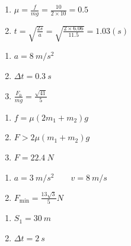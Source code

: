 \item \begin {enumerate} \renewcommand {\labelenumi }{\arabic {enumi}.} \item $\mu = \frac { f } { m g } = \frac { 10 } { 2 \times 10 } = 0.5$ \item $t = \sqrt { \frac { 2 s } { a } } = \sqrt { \frac { 2 \times 6.06 } { 11.5 } } = 1.03 ( s )$ \par \end {enumerate} \par \par 
\item \begin {enumerate} \renewcommand {\labelenumi }{\arabic {enumi}.} \item $ a=8\ m/s^{2} $ \item $ \Delta t=0.3\ s $ \item $\frac { F _ { 0 } } { m g } = \frac { \sqrt { 41 } } { 5 }$ \par \end {enumerate} \par \par 
\item \begin {enumerate} \renewcommand {\labelenumi }{\arabic {enumi}.} \item $f = \mu \left ( 2 m _ { 1 } + m _ { 2 } \right ) g$ \item $F > 2 \mu \left ( m _ { 1 } + m _ { 2 } \right ) g$ \item $F = 22.4\ N$ \par \end {enumerate} \par \par 
\item \begin {enumerate} \renewcommand {\labelenumi }{\arabic {enumi}.} \item $ a=3\ m/s^{2} \qquad v=8\ m/s $ \item $F _ { \min } = \frac { 13 \sqrt { 3 } } { 5 } N$ \par \end {enumerate} \par \par 
\item \begin {enumerate} \renewcommand {\labelenumi }{\arabic {enumi}.} \item $ S_{1}=30 \ m $ \item $ \Delta t =2\ s $ \par \end {enumerate} \par \par 

